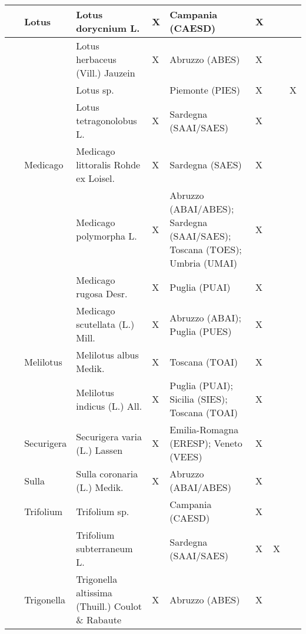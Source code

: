 \documentclass[main.tex]{subfiles}
\begin{document}
        \begin{table}[!ht]
        \centering
    \begin{tabular}[\footnotesize]{|p{2.2cm}|p{2.2cm}|p{2.2cm}|p{1.1cm}|p{1.6cm}|p{0.8cm}|p{1cm}|p{0.8cm}|}
    \hline
        ~ & Lotus & Lotus dorycnium L. & X & Campania (CAESD) & X & ~ & ~ \\ \hline
        ~ & ~ & Lotus herbaceus (Vill.) Jauzein & X & Abruzzo (ABES) & X & ~ & ~ \\ \hline
        ~ & ~ & Lotus sp.  & ~ & Piemonte (PIES) & X & ~ & X \\ \hline
        ~ & ~ & Lotus tetragonolobus L. & X & Sardegna (SAAI/SAES) & X & ~ & ~ \\ \hline
        ~ & Medicago & Medicago littoralis Rohde ex Loisel. & X & Sardegna (SAES) & X & ~ & ~ \\ \hline
        ~ & ~ & Medicago polymorpha L. & X & Abruzzo (ABAI/ABES); Sardegna (SAAI/SAES); Toscana (TOES); Umbria (UMAI) & X & ~ & ~ \\ \hline
            ~ & ~ & Medicago rugosa Desr. & X & Puglia (PUAI) & X & ~ & ~ \\ \hline
        ~ & ~ & Medicago scutellata (L.) Mill. & X & Abruzzo (ABAI); Puglia (PUES) & X & ~ & ~ \\ \hline
        ~ & Melilotus & Melilotus albus Medik. & X & Toscana (TOAI) & X & ~ & ~ \\ \hline
        ~ & ~ & Melilotus indicus (L.) All. & X & Puglia (PUAI); Sicilia (SIES); Toscana (TOAI) & X & ~ & ~ \\ \hline
        ~ & Securigera & Securigera varia (L.) Lassen & X & Emilia-Romagna (ERESP); Veneto (VEES) & X & ~ & ~ \\ \hline
        ~ & Sulla & Sulla coronaria (L.) Medik. & X & Abruzzo (ABAI/ABES) & X & ~ & ~ \\ \hline
        ~ & Trifolium & Trifolium sp. & ~ & Campania (CAESD) & X & ~ & ~ \\ \hline
        ~ & ~ & Trifolium subterraneum L. & ~ & Sardegna (SAAI/SAES) & X & X & ~ \\ \hline
        ~ & Trigonella & Trigonella altissima (Thuill.) Coulot \& Rabaute & X & Abruzzo (ABES) & X & ~ & ~ \\ \hline
        \end{tabular}
    \end{table}
    
    \clearpage
        
\end{document}
